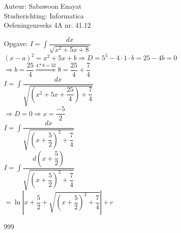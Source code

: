 \documentclass[a4paper]{article}
\begin{document}
  
\noindent \large Auteur: Sabawoon Enayat \\
\noindent \large Studierichting: Informatica\\
\noindent \large Oefeningenreeks 4A nr. 41.12 \\

\newcommand{\dint}{\displaystyle\int}

\medskip

\normalsize

Opgave: $I = \dint \dfrac{dx}{\sqrt{x^2 + 5x + 8}}$\\

$(x - a)^2 = x^2 + 5x + b \Rightarrow D = 5^5 - 4 \cdot 1 \cdot b = 25 - 4b = 0$\\

$\Rightarrow b = \dfrac{25}{4} \overset{4 * 8 = 32}{\Rightarrow} 8 = \dfrac{25}{4} + \dfrac{7}{4} $\\

$I =\dint \dfrac{dx}{\sqrt{\left(x^2 + 5x + \dfrac{25}{4}\right) + \dfrac{7}{4}}}$\\

$\Rightarrow D = 0 \Rightarrow x = \dfrac{-5}{2}$\\

$I = \dint \dfrac{dx}{\sqrt{\left(x + \dfrac{5}{2}\right)^2 + \dfrac{7}{4}}}$\\

$I = \dint \dfrac{d\left(x + \dfrac{5}{2}\right)}{\sqrt{\left(x + \dfrac{5}{2}\right)^2 + \dfrac{7}{4}}}$\\

$= \ln \left|x + \dfrac{5}{2} + \sqrt{\left(x + \dfrac{5}{2}\right)^2 + \dfrac{7}{4}}\right| + c$\\

\begin{thebibliography}{999}
\end{thebibliography}
\end{document}
